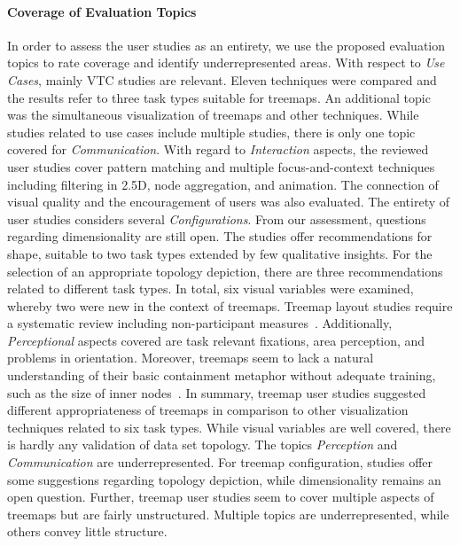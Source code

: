 \documentclass[sigconf,
natbib=true]{acmart}
\begin{document}
\paragraph{\textbf{Coverage of Evaluation Topics}}
In order to assess the user studies as an entirety, we use the proposed evaluation topics to rate coverage and identify underrepresented areas.
With respect to \emph{Use Cases}, mainly VTC studies are relevant.
Eleven techniques were compared and the results refer to three task types suitable for treemaps.
An additional topic was the simultaneous visualization of treemaps and other techniques.
While studies related to use cases include multiple studies, there is only one topic covered for \emph{Communication}. 
With regard to \emph{Interaction} aspects, the reviewed user studies cover pattern matching and multiple focus-and-context techniques including filtering in 2.5D, node aggregation, and animation.
The connection of visual quality and the encouragement of users was also evaluated.
The entirety of user studies considers several \emph{Configurations}.
From our assessment, questions regarding dimensionality are still open.
The studies offer recommendations for shape, suitable to two task types extended by few qualitative insights.
For the selection of an appropriate topology depiction, there are three recommendations related to different task types.
In total, six visual variables were examined, whereby two were new in the context of treemaps.
Treemap layout studies require a systematic review including non-participant measures~\cite{vernier2020-comparison}.
Additionally, \emph{Perceptional} aspects covered are task relevant fixations, area perception, and problems in orientation.
Moreover, treemaps seem to lack a natural understanding of their basic containment metaphor without adequate training, such as the size of inner nodes~\cite{mueller2017-perception}.
In summary, treemap user studies suggested different appropriateness of treemaps in comparison to other visualization techniques related to six task types. 
While visual variables are well covered, there is hardly any validation of data set topology.
The topics \emph{Perception} and \emph{Communication} are underrepresented.
For treemap configuration, studies offer some suggestions regarding topology depiction, while dimensionality remains an open question.
Further, treemap user studies seem to cover multiple aspects of treemaps but are fairly unstructured.
Multiple topics are underrepresented, while others convey little structure.
\end{document}
